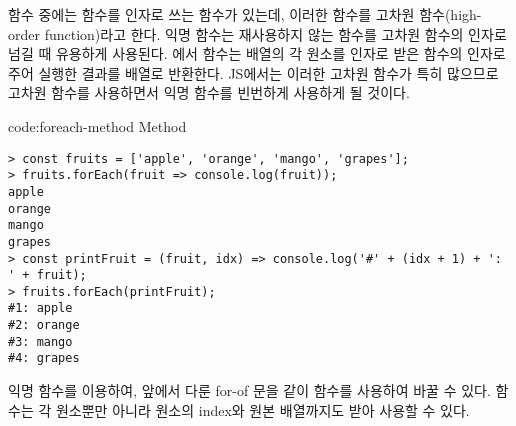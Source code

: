 함수 중에는 함수를 인자로 쓰는 함수가 있는데, 이러한 함수를 고차원 함수(high-order function)라고 한다. 익명 함수는 재사용하지 않는 함수를 고차원 함수의 인자로 넘길 때 유용하게 사용된다. 에서  함수는 배열의 각 원소를 인자로 받은 함수의 인자로 주어 실행한 결과를 배열로 반환한다. JS에서는 이러한 고차원 함수가 특히 많으므로 고차원 함수를 사용하면서 익명 함수를 빈번하게 사용하게 될 것이다.

\begin{codeenv}{code:foreach-method}{ Method}\begin{verbatim}
> const fruits = ['apple', 'orange', 'mango', 'grapes'];
> fruits.forEach(fruit => console.log(fruit));
apple
orange
mango
grapes
> const printFruit = (fruit, idx) => console.log('#' + (idx + 1) + ': ' + fruit);
> fruits.forEach(printFruit);
#1: apple
#2: orange
#3: mango
#4: grapes
\end{verbatim}
\end{codeenv}

익명 함수를 이용하여, 앞에서 다룬 for-of 문을 \와 같이  함수를 사용하여 바꿀 수 있다.  함수는 각 원소뿐만 아니라 원소의 index와 원본 배열까지도 받아 사용할 수 있다.

